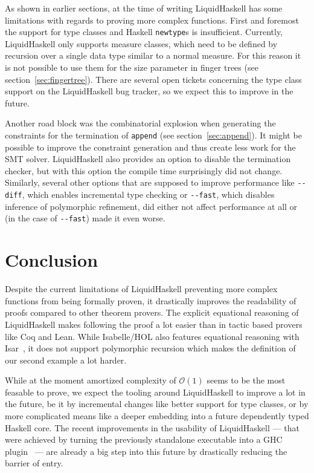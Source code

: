 \documentclass[sigplan,screen,review,anonymous]{acmart}
\renewcommand\O[1]{$\mathcal{O}(#1)$}
\begin{document}
As shown in earlier sections, at the time of writing LiquidHaskell has some limitations with regards to proving more complex functions. First and foremost the support for type classes and Haskell \texttt{newtype}s is insufficient. Currently, LiquidHaskell only supports measure classes, which need to be defined by recursion over a single data type similar to a normal measure. For this reason it is not possible to use them for the size parameter in finger trees (see section~\ref{sec:fingertree}). There are several open tickets concerning the type class support on the LiquidHaskell bug tracker, so we expect this to improve in the future.

Another road block was the combinatorial explosion when generating the constraints for the termination of \texttt{append} (see section~\ref{sec:append}). It might be possible to improve the constraint generation and thus create less work for the SMT solver. LiquidHaskell also provides an option to disable the termination checker, but with this option the compile time surprisingly did not change. Similarly, several other options that are supposed to improve performance like \texttt{{-}{-}diff}, which enables incremental type checking or \texttt{{-}{-}fast}, which disables inference of polymorphic refinement, did either not affect performance at all or (in the case of \texttt{{-}{-}fast}) made it even worse.

\section{Conclusion}\label{sec:conclusion}

Despite the current limitations of LiquidHaskell preventing more complex functions from being formally proven, it drastically improves the readability of proofs compared to other theorem provers. The explicit equational reasoning of LiquidHaskell makes following the proof a lot easier than in tactic based provers like Coq and Lean. While Isabelle/HOL also features equational reasoning with Isar~\cite{isar}, it does not support polymorphic recursion which makes the definition of our second example a lot harder.

While at the moment amortized complexity of \O{1} seems to be the most feasable to prove, we expect the tooling around LiquidHaskell to improve a lot in the future, be it by incremental changes like better support for type classes, or by more complicated means like a deeper embedding into a future dependently typed Haskell core. The recent improvements in the usability of LiquidHaskell --- that were achieved by turning the previously standalone executable into a GHC plugin~\cite{lh_plugin} --- are already a big step into this future by drastically reducing the barrier of entry.
\end{document}
